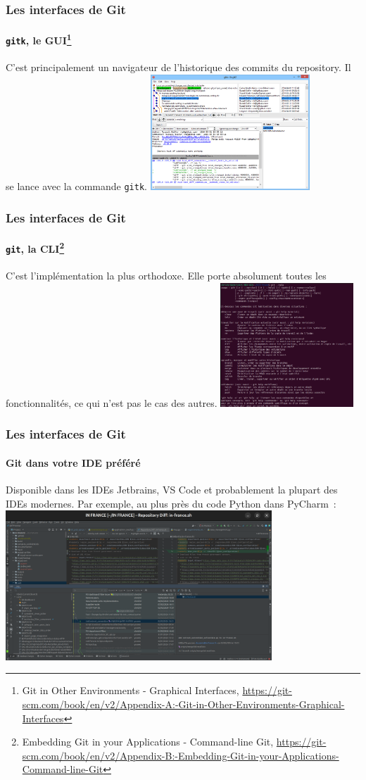 \documentclass{beamer}
\begin{document}
    \begin{frame}
        \frametitle{Les interfaces de Git}
        \framesubtitle{\lstinline{gitk}, le GUI\footnote{Git in Other Environments - Graphical Interfaces, \url{https://git-scm.com/book/en/v2/Appendix-A:-Git-in-Other-Environments-Graphical-Interfaces}}}
        \transdissolve
        C'est principalement un navigateur de l'historique des commits du repository.
        Il se lance avec la commande \lstinline{gitk}.
        \bigbreak
        \centering
        \includegraphics[width=6cm]{image/gitk}
    \end{frame}

    \begin{frame}
        \frametitle{Les interfaces de Git}
        \framesubtitle{\lstinline{git}, la CLI\footnote{Embedding Git in your Applications - Command-line Git, \url{https://git-scm.com/book/en/v2/Appendix-B:-Embedding-Git-in-your-Applications-Command-line-Git}}}
        \transdissolve
        C'est l'implémentation la plus orthodoxe.
        Elle porte absolument toutes les fonctionnalités, ce qui n'est pas le cas des autres.
        \bigbreak
        \centering
        \includegraphics[width=5cm]{image/git-cli-help}
    \end{frame}

    \begin{frame}
        \frametitle{Les interfaces de Git}
        \framesubtitle{Git dans votre IDE préféré}
        \transdissolve
        Disponible dans les IDEs Jetbrains, VS Code et probablement la plupart des IDEs modernes.
        Par exemple, au plus près du code Python dans PyCharm~:
        \bigbreak
        \centering
        \includegraphics[width=10cm]{image/git-in-pycharm.png}
    \end{frame}
\end{document}
